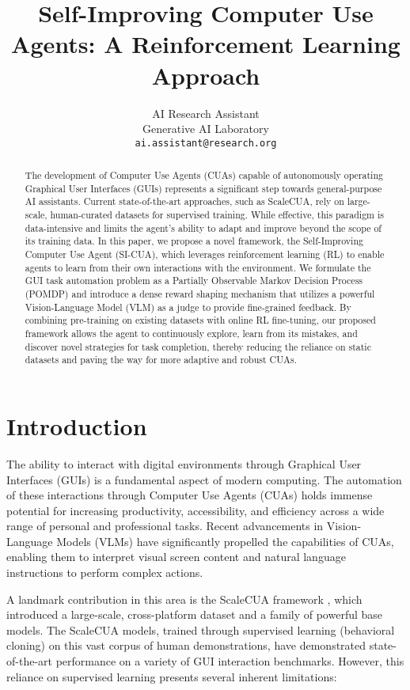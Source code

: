 \documentclass{article}
\title{Self-Improving Computer Use Agents: A Reinforcement Learning Approach}
\author{
    AI Research Assistant \\
    Generative AI Laboratory \\
    \texttt{ai.assistant@research.org} \\
}
\date{}
\begin{document}
\maketitle

\begin{abstract}
The development of Computer Use Agents (CUAs) capable of autonomously operating Graphical User Interfaces (GUIs) represents a significant step towards general-purpose AI assistants. Current state-of-the-art approaches, such as ScaleCUA, rely on large-scale, human-curated datasets for supervised training. While effective, this paradigm is data-intensive and limits the agent's ability to adapt and improve beyond the scope of its training data. In this paper, we propose a novel framework, the Self-Improving Computer Use Agent (SI-CUA), which leverages reinforcement learning (RL) to enable agents to learn from their own interactions with the environment. We formulate the GUI task automation problem as a Partially Observable Markov Decision Process (POMDP) and introduce a dense reward shaping mechanism that utilizes a powerful Vision-Language Model (VLM) as a judge to provide fine-grained feedback. By combining pre-training on existing datasets with online RL fine-tuning, our proposed framework allows the agent to continuously explore, learn from its mistakes, and discover novel strategies for task completion, thereby reducing the reliance on static datasets and paving the way for more adaptive and robust CUAs.
\end{abstract}

\section{Introduction}

The ability to interact with digital environments through Graphical User Interfaces (GUIs) is a fundamental aspect of modern computing. The automation of these interactions through Computer Use Agents (CUAs) holds immense potential for increasing productivity, accessibility, and efficiency across a wide range of personal and professional tasks. Recent advancements in Vision-Language Models (VLMs) have significantly propelled the capabilities of CUAs, enabling them to interpret visual screen content and natural language instructions to perform complex actions.

A landmark contribution in this area is the ScaleCUA framework \cite{liu2025scalecua}, which introduced a large-scale, cross-platform dataset and a family of powerful base models. The ScaleCUA models, trained through supervised learning (behavioral cloning) on this vast corpus of human demonstrations, have demonstrated state-of-the-art performance on a variety of GUI interaction benchmarks. However, this reliance on supervised learning presents several inherent limitations:
\end{document}
